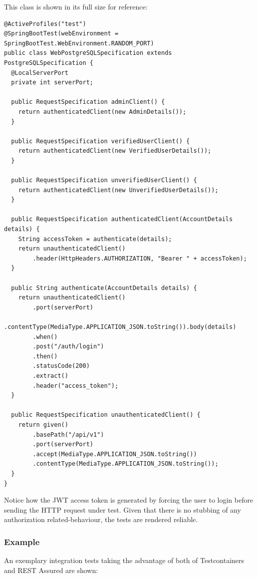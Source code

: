 \documentclass[a4paper,twoside,12pt]{book}
\begin{document}
This class is shown in its full size for reference:
\begin{verbatim}
@ActiveProfiles("test")
@SpringBootTest(webEnvironment = SpringBootTest.WebEnvironment.RANDOM_PORT)
public class WebPostgreSQLSpecification extends PostgreSQLSpecification {
  @LocalServerPort
  private int serverPort;

  public RequestSpecification adminClient() {
    return authenticatedClient(new AdminDetails());
  }

  public RequestSpecification verifiedUserClient() {
    return authenticatedClient(new VerifiedUserDetails());
  }

  public RequestSpecification unverifiedUserClient() {
    return authenticatedClient(new UnverifiedUserDetails());
  }

  public RequestSpecification authenticatedClient(AccountDetails details) {
    String accessToken = authenticate(details);
    return unauthenticatedClient()
        .header(HttpHeaders.AUTHORIZATION, "Bearer " + accessToken);
  }

  public String authenticate(AccountDetails details) {
    return unauthenticatedClient()
        .port(serverPort)
        .contentType(MediaType.APPLICATION_JSON.toString()).body(details)
        .when()
        .post("/auth/login")
        .then()
        .statusCode(200)
        .extract()
        .header("access_token");
  }

  public RequestSpecification unauthenticatedClient() {
    return given()
        .basePath("/api/v1")
        .port(serverPort)
        .accept(MediaType.APPLICATION_JSON.toString())
        .contentType(MediaType.APPLICATION_JSON.toString());
  }
}
\end{verbatim}

Notice how the JWT access token is generated by forcing the user to login before sending the HTTP request under test. Given that there is no stubbing of any authorization related-behaviour, the tests are rendered reliable.

\subsubsection{Example}

An exemplary integration tests taking the advantage of both of Testcontainers and REST Assured are shown:
\end{document}
